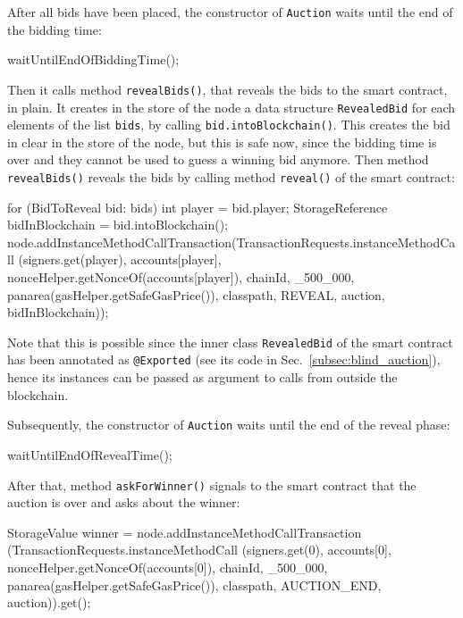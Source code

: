 After all bids have been placed, the constructor of \texttt{Auction} waits until the end of
the bidding time:
%
\begin{codebox}\begin{javalst}
waitUntilEndOfBiddingTime();
\end{javalst}\end{codebox}
%
Then it calls method \texttt{revealBids()}, that reveals
the bids to the smart contract, in plain. It creates in the store of the node
a data structure
\texttt{RevealedBid} for each elements of the list \texttt{bids}, by calling
\texttt{bid.intoBlockchain()}.
This creates the bid in clear in the store of the node, but this is safe now,
since the bidding time is over and
they cannot be used to guess a winning bid anymore. Then method \texttt{revealBids()}
reveals the bids by calling method \texttt{reveal()} of the smart contract:
%
\begin{codebox}\begin{javalst}
for (BidToReveal bid: bids) {
  int player = bid.player;
  StorageReference bidInBlockchain = bid.intoBlockchain();
  node.addInstanceMethodCallTransaction(TransactionRequests.instanceMethodCall
    (signers.get(player), accounts[player],
    nonceHelper.getNonceOf(accounts[player]), chainId, _500_000,
    panarea(gasHelper.getSafeGasPrice()),
    classpath, REVEAL, auction, bidInBlockchain));
}
\end{javalst}\end{codebox}
%
Note that this is possible since the inner class \texttt{RevealedBid} of the
smart contract has been annotated as \texttt{@Exported}
(see its code in Sec.~\ref{subsec:blind_auction}), hence its instances can be
passed as argument to calls from outside the blockchain.

Subsequently, the constructor of \texttt{Auction} waits until the end of the reveal phase:
%
\begin{codebox}\begin{javalst}
waitUntilEndOfRevealTime();
\end{javalst}\end{codebox}
%
After that, method \texttt{askForWinner()}
signals to the smart contract that the auction is over and asks about the winner:
%
\begin{codebox}\begin{javalst}
StorageValue winner = node.addInstanceMethodCallTransaction
  (TransactionRequests.instanceMethodCall
  (signers.get(0), accounts[0], nonceHelper.getNonceOf(accounts[0]),
  chainId, _500_000, panarea(gasHelper.getSafeGasPrice()),
  classpath, AUCTION_END, auction)).get();
\end{javalst}\end{codebox}
  
